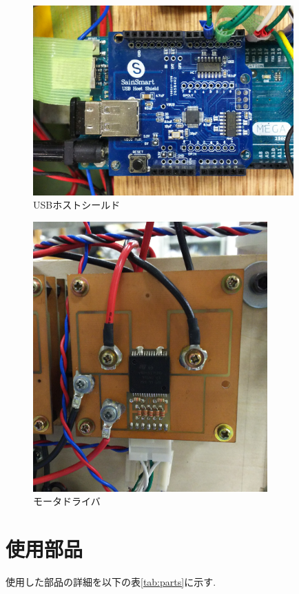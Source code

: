\begin{figure}[htbp]
  \begin{center}
    \includegraphics[width=100mm]{img/USBhs.JPG}
    \end{center}
  \caption{USBホストシールド}
 \label{fig:USBhs}
\end{figure}

\begin{figure}[!htbp]
  \begin{center}
    \includegraphics[width=90mm]{img/motordrive.JPG}
    \end{center}
  \caption{モータドライバ}
 \label{fig:motordrive}
\end{figure}

\section{使用部品}
使用した部品の詳細を以下の表\ref{tab:parts}に示す.

